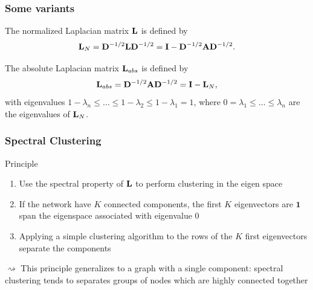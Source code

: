 \documentclass{beamer}\usepackage[]{graphicx}\usepackage[]{color}
\begin{document}
\begin{frame}
  \frametitle{Some variants}

  \begin{definition}
    The normalized Laplacian matrix $\mathbf{L}$ is defined by 
    \[
      \mathbf{L}_N = \mathbf{D}^{-1/2}\mathbf{L}\mathbf{D}^{-1/2} = \mathbf{I} - \mathbf{D}^{-1/2} \mathbf{A} \mathbf{D}^{-1/2}.
    \]
  \end{definition}
  
  \vfill

  \begin{definition}
    The absolute Laplacian matrix $\mathbf{L}_{abs}$ is defined by 
    \[
      \mathbf{L}_{abs} = \mathbf{D}^{-1/2}\mathbf{A}\mathbf{D}^{-1/2} = \mathbf{I} - \mathbf{L}_N,
    \]
    with eigenvalues $1-\lambda_n \leq \dots \leq 1-\lambda_2 \leq 1-\lambda_1 = 1$, where $0=\lambda_1\leq \dots \leq \lambda_n$ are the eigenvalues of $\mathbf{L}_N$.
  \end{definition}

\end{frame}

\begin{frame}
  \frametitle{Spectral Clustering}
    
  \begin{block}{Principle}
  
  \begin{enumerate}
    \item Use the spectral property of $\mathbf{L}$ to perform clustering in the eigen space \medskip
    \item If the network have $K$ connected components, the first $K$ eigenvectors are $\mathbf{1}$ span the eigenspace associated with eigenvalue $0$ \medskip
    \item Applying a simple clustering algorithm to the rows of the $K$ first eigenvectors separate the components
  \end{enumerate}
  $\rightsquigarrow$ This principle generalizes to a graph with a single component: spectral clustering tends to separates groups of nodes which are highly connected together
  
  \end{block}
  
\end{frame}
\end{document}
